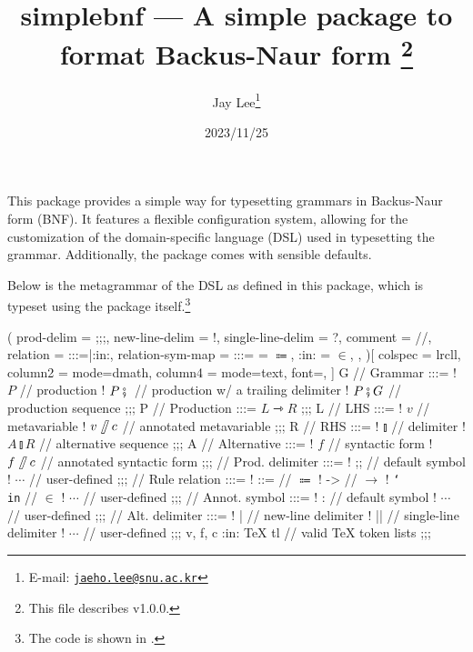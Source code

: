 \documentclass[11pt]{article}
\title{%
  \textsf{simplebnf} --- A simple package to format Backus-Naur form%
  \footnote{This file describes v1.0.0.}}
\author{Jay Lee\footnote{E-mail: %
  \href{mailto:jaeho.lee@snu.ac.kr}{\texttt{jaeho.lee@snu.ac.kr}}}}
\date{2023/11/25}
\begin{document}
\maketitle


\vfill
This package provides a simple way for typesetting grammars in Backus-Naur form (BNF).
It features a flexible configuration system, allowing for the customization of the domain-specific language (DSL) used in typesetting the grammar.
Additionally, the package comes with sensible defaults.

Below is the metagrammar of the DSL as defined in this package, which is typeset using the package itself.\footnote{The code is shown in .}
\begin{tcolorbox}
  \begin{center}
    \begin{bnf}(
      prod-delim = ;;;,
      new-line-delim = !,
      single-line-delim = ?,
      comment = //,
      relation = {:::=|:in:},
      relation-sym-map =
        {
          {:::=} = $\Coloneqq$,
          {:in:} = $\in$,
        },
    )[
      colspec = lrcll,
      column{2} = {mode=dmath},
      column{4} = {mode=text, font=\ttfamily},
    ]
      G // Grammar :::=
      ! $P$ // production
      ! $P \fatsemi {}$ // production w/ a trailing delimiter
      ! $P \fatsemi G$ // production sequence
    ;;;
      P // Production :::= $L \rightarrowtriangle R$
    ;;;
      L // LHS :::=
      ! $v$ // metavariable
      ! $v\!\fatslash\,c$ // annotated metavariable
    ;;;
      R // RHS :::=
      ! $\talloblong$ // delimiter
      ! $A \talloblong R$ // alternative sequence
    ;;;
      A // Alternative :::=
      ! $f$ // syntactic form
      ! $f\!\fatslash\,c$ // annotated syntactic form
    ;;;
      \fatsemi // Prod. delimiter :::=
      ! ;; // default symbol
      ! $\cdots$ // user-defined
    ;;;
      \rightarrowtriangle // Rule relation :::=
      ! ::= // $\Coloneqq$
      ! -> // $\to$
      ! \texttt{\char`\\in} // $\in$
      ! $\cdots$ // user-defined
    ;;;
      \fatslash // Annot. symbol :::=
      ! : // default symbol
      ! $\cdots$ // user-defined
    ;;;
      \talloblong // Alt. delimiter :::=
      ! | // new-line delimiter
      ! || // single-line delimiter
      ! $\cdots$ // user-defined
    ;;;
      v, f, c :in: \textsf{\TeX{} tl} // valid \TeX{} token lists
    ;;;
    \end{bnf}
  \end{center}
\end{tcolorbox}
\vfill
\end{document}
